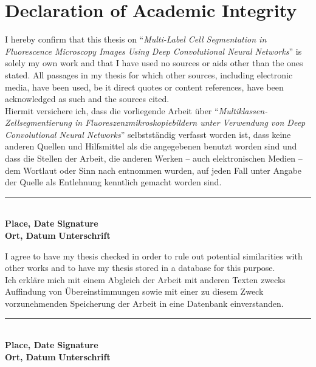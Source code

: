 \chapter* {Declaration of Academic Integrity}

I hereby confirm that this thesis on ``\textit{Multi-Label Cell Segmentation in Fluorescence Microscopy Images Using Deep Convolutional Neural Networks}'' is solely my own work and that I have used no sources or aids other than the ones stated. All passages in my thesis for which other sources, including electronic media, have been used, be it direct quotes or content references, have been acknowledged as such and the sources cited.\\

\noindent Hiermit versichere ich, dass die vorliegende Arbeit über ``\textit{Multi\-klassen-Zell\-segmen\-tierung in Fluoreszenzmikroskopiebildern unter Verwendung von Deep Convolutional Neural Networks}'' selbstständig verfasst worden ist, dass keine anderen Quellen und Hilfsmittel als die angegebenen benutzt worden sind und dass die Stellen der Arbeit, die anderen Werken – auch elektronischen Medien – dem Wortlaut oder Sinn nach entnommen wurden, auf jeden Fall unter Angabe der Quelle als Entlehnung kenntlich gemacht worden sind.\\[1.0cm]


\begin {flushleft}
	\rule{12cm}{0.4pt}\\
	\textbf{Place, Date} \hspace{4.1cm}\textbf{Signature}\\
	\noindent \textbf{Ort, Datum} \hspace{4cm}\textbf{Unterschrift}\\
\end {flushleft}
\vspace{1.0cm}

\noindent I agree to have my thesis checked in order to rule out potential similarities with other works and to have my thesis stored in a database for this purpose.\\

\noindent Ich erkläre mich mit einem Abgleich der Arbeit mit anderen Texten zwecks Auffindung von Übereinstimmungen sowie mit einer zu diesem Zweck vor\-zu\-nehm\-en\-den Speicherung der Arbeit in eine Datenbank einverstanden.\\[1.0cm]


\begin {flushleft}
	\rule{12cm}{0.4pt}\\
	\textbf{Place, Date} \hspace{4.1cm}\textbf{Signature}\\
	\noindent \textbf{Ort, Datum} \hspace{4cm}\textbf{Unterschrift}\\
\end {flushleft}